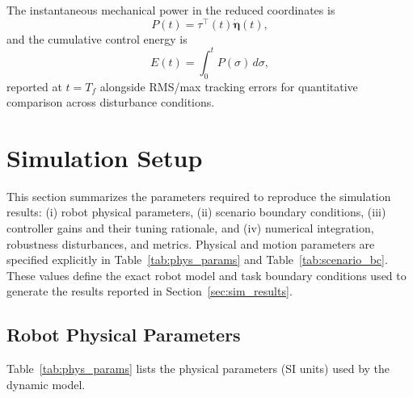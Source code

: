 \documentclass[conference]{IEEEtran}
\newcommand{\etav}{\bm{\eta}}
\begin{document}
The instantaneous mechanical power in the reduced coordinates is
\begin{equation}
P(t)=\tau^\top(t)\dot{\etav}(t),
\end{equation}
and the cumulative control energy is
\begin{equation}
E(t)=\int_{0}^{t} P(\sigma)\,d\sigma,
\end{equation}
reported at $t=T_f$ alongside RMS/max tracking errors for quantitative
comparison across disturbance conditions.

\section{Simulation Setup}
\label{sec:sim_setup}
This section summarizes the parameters required to reproduce the simulation results:
(i) robot physical parameters, (ii) scenario boundary conditions, (iii) controller gains and
their tuning rationale, and (iv) numerical integration, robustness disturbances, and metrics.
Physical and motion parameters are specified explicitly in Table~\ref{tab:phys_params} and
Table~\ref{tab:scenario_bc}. These values define the exact robot model and task boundary
conditions used to generate the results reported in Section~\ref{sec:sim_results}.


\subsection{Robot Physical Parameters}
Table~\ref{tab:phys_params} lists the physical parameters (SI units) used by the dynamic model.
\end{document}
